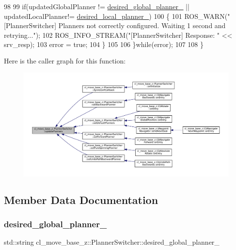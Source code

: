 \begin{DoxyCode}
98 
99     \textcolor{keywordflow}{if}(updatedGlobalPlanner != \hyperlink{classcl__move__base__z_1_1PlannerSwitcher_aef047d3778b2993c1df146bbad43e03d}{desired\_global\_planner\_} || updatedLocalPlanner!= 
      \hyperlink{classcl__move__base__z_1_1PlannerSwitcher_a6cbf65f11bb69125f913caaabdf7b4cf}{desired\_local\_planner\_})
100     \{
101       ROS\_WARN(\textcolor{stringliteral}{"[PlannerSwitcher] Planners not correctly configured. Waiting 1 second and retrying..."});
102       ROS\_INFO\_STREAM(\textcolor{stringliteral}{"[PlannerSwitcher] Response: "} << srv\_resp);
103       error = \textcolor{keyword}{true};
104     \}
105 
106   \}\textcolor{keywordflow}{while}(error);
107 
108 \}
\end{DoxyCode}
Here is the caller graph for this function\+:
\nopagebreak
\begin{figure}[H]
\begin{center}
\leavevmode
\includegraphics[width=350pt]{classcl__move__base__z_1_1PlannerSwitcher_a146641f63aea3185daab4c5cbb789550_icgraph}
\end{center}
\end{figure}


\subsection{Member Data Documentation}
\mbox{\label{classcl__move__base__z_1_1PlannerSwitcher_aef047d3778b2993c1df146bbad43e03d}} 
\subsubsection{\texorpdfstring{desired\+\_\+global\+\_\+planner\+\_\+}{desired\_global\_planner\_}}
{\footnotesize\ttfamily std\+::string cl\+\_\+move\+\_\+base\+\_\+z\+::\+Planner\+Switcher\+::desired\+\_\+global\+\_\+planner\+\_\+\hspace{0.3cm}{\ttfamily [private]}}



